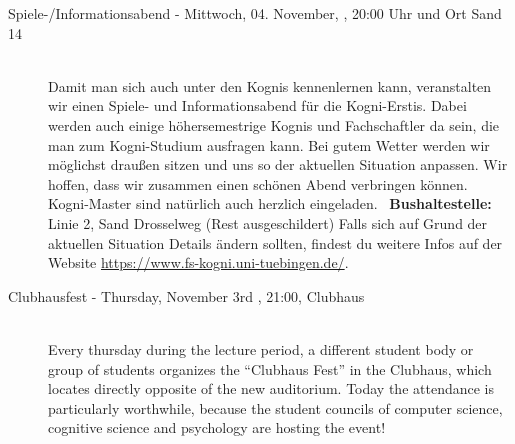 \begin{description}
\ifkogwiss
    \item[Spiele-/Informationsabend - Mittwoch, 04. November, \YEAR, 20:00 Uhr und Ort Sand 14]\ \\
         Damit man sich auch unter den Kognis kennenlernen kann, veranstalten wir einen Spiele- und Informationsabend für die Kogni-Erstis. Dabei werden auch einige höhersemestrige Kognis und Fachschaftler da sein, die man zum Kogni-Studium ausfragen kann. Bei gutem Wetter werden wir möglichst draußen sitzen und uns so der aktuellen Situation anpassen. Wir hoffen, dass wir zusammen einen schönen Abend verbringen können. Kogni-Master sind natürlich auch herzlich eingeladen.
	~\textbf{Bushaltestelle:} Linie 2, Sand Drosselweg (Rest ausgeschildert)
	Falls sich auf Grund der aktuellen Situation Details ändern sollten, findest du weitere Infos auf der Website \url{https://www.fs-kogni.uni-tuebingen.de/}.
\fi




\ifml
    \item[Clubhausfest - Thursday, November 3rd \YEAR, 21:00, Clubhaus]\ \\
        Every thursday during the lecture period, a different student body or group of students organizes the "`Clubhaus Fest"' in the Clubhaus, which locates directly opposite of the new auditorium. Today the attendance is particularly worthwhile, because the student councils of computer science, cognitive science and psychology are hosting the event! 


\end{description}
